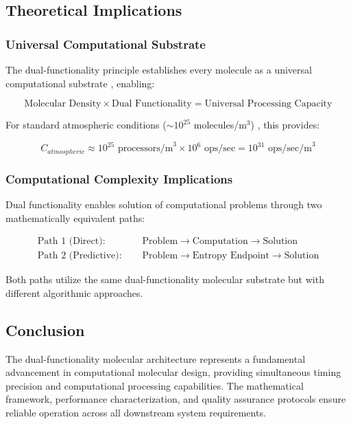 \subsection{Theoretical Implications}

\subsubsection{Universal Computational Substrate}

The dual-functionality principle establishes every molecule as a universal computational substrate \cite{lloyd2000ultimate}, enabling:

\begin{equation}
\text{Molecular Density} \times \text{Dual Functionality} = \text{Universal Processing Capacity}
\end{equation}

For standard atmospheric conditions ($\sim 10^{25}$ molecules/m$^3$) \cite{sears2003university}, this provides:

\begin{equation}
C_{atmospheric} \approx 10^{25} \text{ processors/m}^3 \times 10^6 \text{ ops/sec} = 10^{31} \text{ ops/sec/m}^3
\end{equation}

\subsubsection{Computational Complexity Implications}

Dual functionality enables solution of computational problems through two mathematically equivalent paths:

\begin{align}
\text{Path 1 (Direct): } &\quad \text{Problem} \rightarrow \text{Computation} \rightarrow \text{Solution} \\
\text{Path 2 (Predictive): } &\quad \text{Problem} \rightarrow \text{Entropy Endpoint} \rightarrow \text{Solution}
\end{align}

Both paths utilize the same dual-functionality molecular substrate but with different algorithmic approaches.

\subsection{Conclusion}

The dual-functionality molecular architecture represents a fundamental advancement in computational molecular design, providing simultaneous timing precision and computational processing capabilities. The mathematical framework, performance characterization, and quality assurance protocols ensure reliable operation across all downstream system requirements.

